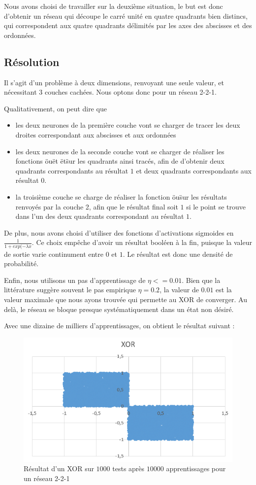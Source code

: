 Nous avons choisi de travailler sur la deuxième situation, le but est donc d'obtenir un réseau qui découpe le carré unité en quatre quadrants bien distincs, qui correspondent aux quatre quadrants délimités par les axes des abscisses et des ordonnées.

\subsection{Résolution}

Il s'agit d'un problème à deux dimensions, renvoyant une seule valeur, et nécessitant 3 couches cachées. Nous optons donc pour un réseau 2-2-1. 

Qualitativement, on peut dire que 
\begin{itemize}
  \item les deux neurones de la première couche vont se charger de tracer les deux droites correspondant aux abscisses et aux ordonnées
  \item les deux neurones de la seconde couche vont se charger de réaliser les fonctions \"ou\" et \"et\" sur les quadrants ainsi tracés, afin de d'obtenir deux quadrants correspondants au résultat $1$ et deux quadrants correspondants aux résultat $0$.
  \item la troisième couche se charge de réaliser la fonction \"ou\" sur les résultats renvoyés par la couche 2, afin que le résultat final soit $1$ si le point se trouve dans l'un des deux quadrants correspondant au résultat $1$.
\end{itemize}

De plus, nous avons choisi d'utiliser des fonctions d'activations sigmoides en $\frac{1}{1+exp(-\lambda x}$. Ce choix empêche d'avoir un résultat booléen à la fin, puisque la valeur de sortie varie continument entre $0$ et $1$. Le résultat est donc une densité de probabilité.

Enfin, nous utilisons un pas d'apprentissage de $\eta <= 0.01$. Bien que la littérature suggère souvent le pas empirique $\eta = 0.2$, la valeur de $0.01$ est la valeur maximale que nous ayons trouvée qui permette au XOR de converger. Au delà, le réseau se bloque presque systématiquement dans un état non désiré.

Avec une dizaine de milliers d'apprentissages, on obtient le résultat suivant : 

\begin{figure}[h!]
  \centering
  \includegraphics[scale=0.5]{images/resultat_xor.png}
  \caption{Résultat d'un XOR sur $1000$ tests après $10000$ apprentissages pour un réseau 2-2-1}
\end{figure}
